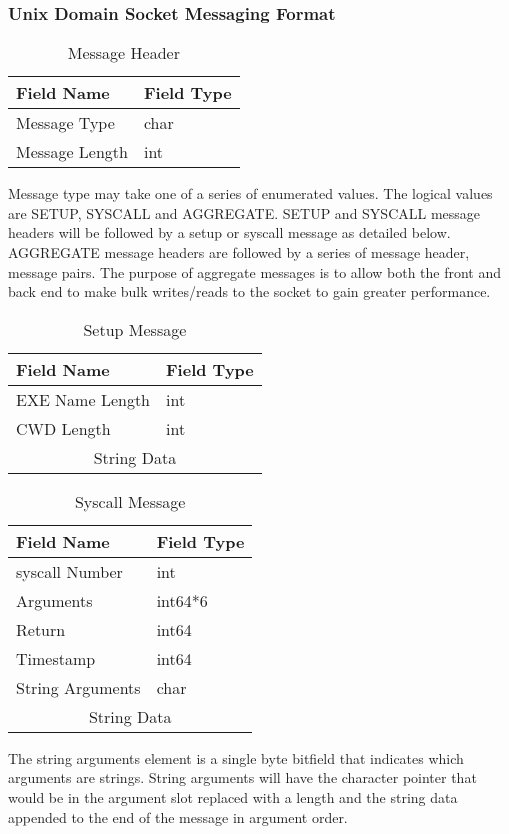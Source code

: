 \subsubsection{Unix Domain Socket Messaging Format}
\label{ProvProt}
\begin{table}[H]
\begin{tabular}{|l|l|}
\hline
Field Name & Field Type\\
\hline
Message Type & char\\
Message Length & int\\
\hline
\end{tabular}
\caption{Message Header}
\end{table}

Message type may take one of a series of enumerated values. The logical values are SETUP, SYSCALL and AGGREGATE. SETUP and SYSCALL message headers will be followed by a setup or syscall message as detailed below. AGGREGATE message headers are followed by a series of message header, message pairs. The purpose of aggregate messages is to allow both the front and back end to make bulk writes/reads to the socket to gain greater performance.

\begin{table}[H]
\begin{tabular}{|l|l|}
\hline
Field Name & Field Type\\
\hline
EXE Name Length & int\\
CWD Length & int\\
\hline
\multicolumn{2}{|c|}{String Data}\\
\hline
\end{tabular}
\caption{Setup Message}
\end{table}

\begin{table}[H]
\begin{tabular}{|l|l|}
\hline
Field Name & Field Type\\
\hline
syscall Number & int\\
Arguments & int64*6\\
Return & int64\\
Timestamp & int64\\
String Arguments & char\\
\hline
\multicolumn{2}{|c|}{String Data}\\
\hline
\end{tabular}
\caption{Syscall Message}
\end{table}

The string arguments element is a single byte bitfield that indicates which arguments are strings. String arguments will have the character pointer that would be in the argument slot replaced with a length and the string data appended to the end of the message in argument order.

